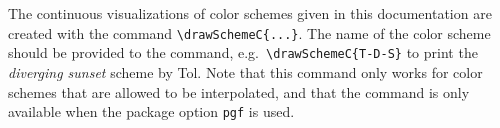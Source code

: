 \documentclass{scrartcl}
\newcommand\marg[1]{\leavevmode\marginpar{\raggedleft #1}}
\begin{document}
\cprotect\marg{\verb!\drawSchemeC{...}!}%
The continuous visualizations of color schemes given in this documentation are created with the command \verb!\drawSchemeC{...}!.
The name of the color scheme should be provided to the command, e.g.\ \verb!\drawSchemeC{T-D-S}! to print the \emph{diverging sunset} scheme by Tol.
Note that this command only works for color schemes that are allowed to be interpolated, and that the command is only available when the package option \verb!pgf! is used.

\clearpage
\printbibliography
\end{document}
